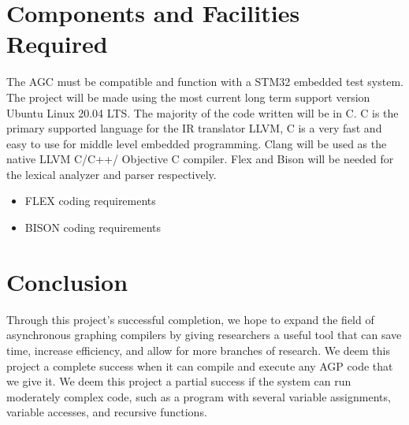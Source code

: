 \documentclass[11pt]{article}
\begin{document}
\section{Components and Facilities Required}

The AGC must be compatible and function with a STM32 embedded test system. The project will be made using the most current long term support version Ubuntu Linux 20.04 LTS. The majority of the code written will be in C. C is the primary supported language for the IR translator LLVM, C is a very fast and easy to use for middle level embedded programming. Clang will be used as the native LLVM C/C++/ Objective C compiler. Flex and Bison will be needed for the lexical analyzer and parser respectively.
\begin{itemize}
\item FLEX coding requirements
\item BISON coding requirements
\end{itemize}



\section{Conclusion}

Through this project’s successful completion, we hope to expand the field of asynchronous graphing compilers by giving researchers a useful tool that can save time, increase efficiency, and allow for more branches of research. We deem this project a complete success when it can compile and execute any AGP code that we give it. We deem this project a partial success if the system can run moderately complex code, such as a program with several variable assignments, variable accesses, and recursive functions. 

\pagebreak
\end{document}
